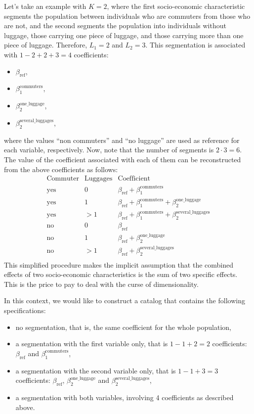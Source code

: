 \documentclass[12pt,a4paper]{article}
\begin{document}
Let's take an example with $K=2$, where the first socio-economic
characteristic segments the population between individuals who are
commuters from those who are not, and the second segments the
population into individuals without luggage, those carrying one piece
of luggage, and those carrying more than one piece of
luggage. Therefore, $L_1=2$ and $L_2=3$. This segmentation is
associated with $1-2+2+3=4$ coefficients:
\begin{itemize}
\item $\beta_\text{ref}$,
\item $\beta_1^\text{commuters}$,
\item $\beta_2^\text{one\_luggage}$,
\item $\beta_2^\text{several\_luggages}$,
\end{itemize}
where the values ``non commuters'' and ``no luggage'' are used as reference for each variable, respectively.
Now, note that the number of segments is  $2\cdot3=6$. The value of the coefficient associated with each of them can be reconstructed from the above coefficients as follows:
\[
  \begin{array}{lll}
    \text{Commuter} & \text{Luggages} & \text{Coefficient}\\
    \hline
       \text{yes} &    0  &  \beta_\text{ref} + \beta_1^\text{commuters}\\
       \text{yes} &    1  &  \beta_\text{ref} + \beta_1^\text{commuters} + \beta_2^\text{one\_luggage}\\
       \text{yes} &    >1  & \beta_\text{ref} + \beta_1^\text{commuters} + \beta_2^\text{several\_luggages}\\
       \text{no} &    0  & \beta_\text{ref}  \\
       \text{no} &    1  &  \beta_\text{ref} + \beta_2^\text{one\_luggage}\\
       \text{no} &    >1  & \beta_\text{ref} + \beta_2^\text{several\_luggages} \\
  \end{array}
  \]
This simplified procedure makes the implicit assumption that the combined effects of two socio-economic characteristics is the sum of two specific effects. This is the price to pay to deal with the curse of dimensionality.  

In this context, we would like to construct a catalog that contains
the following specifications:
\begin{itemize}
\item no segmentation, that is, the same coefficient for the whole population,
\item a segmentation with the first variable only, that is $1-1+2=2$ coefficients: $\beta_\text{ref}$ and $\beta_1^\text{commuters}$,
\item a segmentation with the second variable only, that is $1-1+3=3$ coefficients: $\beta_\text{ref}$, $\beta_2^\text{one\_luggage}$ and $\beta_2^\text{several\_luggages}$,
\item a segmentation with both variables, involving 4 coefficients as described above.
\end{itemize}
\end{document}
